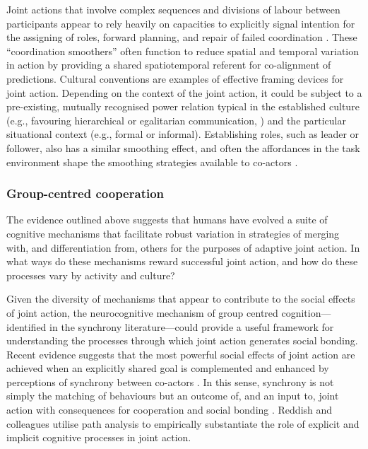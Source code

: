 \begin{CJK}{UTF8}{gbsn}
{
Joint actions that involve complex sequences and divisions of labour between participants appear to rely heavily on capacities to explicitly signal intention for the assigning of roles, forward planning, and repair of failed coordination \citep{Frith2010}. These ``coordination smoothers'' \citep{Vesper2017} often function to reduce spatial and temporal variation in action by providing a shared spatiotemporal referent for co-alignment of predictions.  Cultural conventions are examples of effective framing devices for joint action.  Depending on the context of the joint action, it could be subject to a pre-existing, mutually recognised power relation typical in the established culture (e.g., favouring hierarchical or egalitarian communication, \citep[see]{Cheon2011}) and the particular situational context (e.g., formal or informal).
Establishing roles, such as leader or follower, also has a similar smoothing effect, and often the affordances in the task environment shape the smoothing strategies available to co-actors \citep{Marsh2009}.

\subsubsection{Group-centred cooperation}
The evidence outlined above suggests that humans have evolved a suite of cognitive mechanisms that facilitate robust variation in strategies of merging with, and differentiation from, others for the purposes of adaptive joint action. In what ways do these mechanisms reward successful joint action, and how do these processes vary by activity and culture?

Given the diversity of mechanisms that appear to contribute to the social effects of joint action, the neurocognitive mechanism of group centred cognition---identified in the synchrony literature---could provide a useful framework for understanding the processes through which joint action generates social bonding.  Recent evidence suggests that the most powerful social effects of joint action are achieved when an explicitly shared goal is complemented and enhanced by perceptions of synchrony between co-actors \citep{Frith2010,Reddish2013}.
In this sense, synchrony is not simply the matching of behaviours but an outcome of, and an input to, joint action with consequences for cooperation and social bonding \citep{Keller2014,Lumsden2012,Obhi2011}.
Reddish and colleagues \textcite{Reddish2013} utilise path analysis to empirically substantiate the role of explicit and implicit cognitive processes in joint action.

}
\end{CJK}
